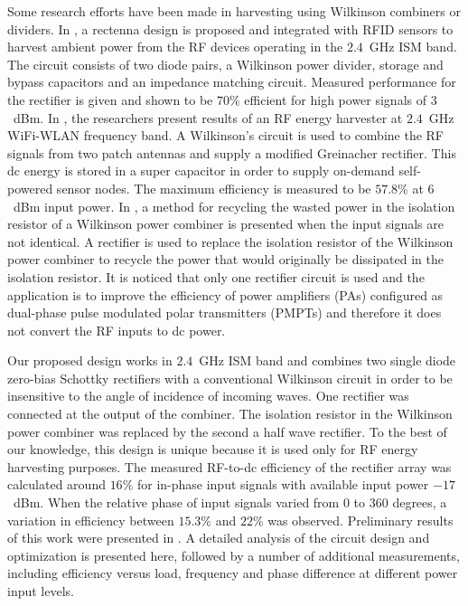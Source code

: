 \documentclass[journal]{IEEEtran}
\begin{document}
Some research efforts have been made in harvesting
using Wilkinson combiners or dividers. 
%
In \cite{olgun2010low}, a rectenna design is proposed and integrated with RFID sensors to harvest ambient power from the RF devices operating in the $2.4$~GHz ISM band.
%
The circuit consists of two diode pairs, a Wilkinson power divider, storage and bypass capacitors and an impedance matching circuit.
%
Measured performance for the rectifier is given and shown to be $70\%$ efficient for high power signals of $3$~dBm.
%
In  \cite{alneyadi20142}, the researchers present results of an RF energy harvester at $2.4$~GHz WiFi-WLAN frequency band. 
%
A Wilkinson's circuit is used to combine the RF signals from two patch antennas and supply a modified Greinacher rectifier. 
%
This dc energy is stored in a super capacitor in order to
supply on-demand self-powered sensor nodes.
%
The maximum efficiency is measured to be $57.8\%$ at $6$~dBm  input power. 
%
%
%
%
%
In \cite{wangpower}, a method for recycling the
wasted power in the isolation resistor of a Wilkinson power
combiner is presented when the input signals are not identical.
%
A rectifier is used to replace the isolation resistor of the Wilkinson
power combiner to recycle the power that would originally be
dissipated in the isolation resistor.
%
It is noticed that only one rectifier circuit is used  and the application is to improve the efficiency of power amplifiers (PAs) configured as dual-phase pulse modulated polar transmitters (PMPTs) and  therefore it does not convert the RF inputs to dc power.
%

Our proposed  design works in $2.4$~GHz ISM band and  combines two  single diode zero-bias Schottky rectifiers with a conventional Wilkinson circuit in order to be insensitive to
the angle of incidence of incoming waves.
%
One rectifier was connected at the output of the combiner. 
%
The isolation resistor in the Wilkinson power combiner
was replaced by the second a half wave rectifier.
%
To the best of our knowledge, this  design is unique because it is used only for RF energy harvesting purposes. 
%
The measured  RF-to-dc efficiency of the rectifier array was calculated   around $16\%$ for in-phase input signals with available input power $-17$~dBm. 
%
When  the relative phase of input signals varied
from $0$ to $360$ degrees, a variation in efficiency between $15.3\%$ and $22\%$ was observed.
%
Preliminary results of this work were presented in   \cite{daskalakis20182}. 
%
A detailed analysis of the circuit design and optimization is presented here, followed by a number of additional measurements, including efficiency  versus load, frequency and phase difference at different power input levels.
%
\end{document}

